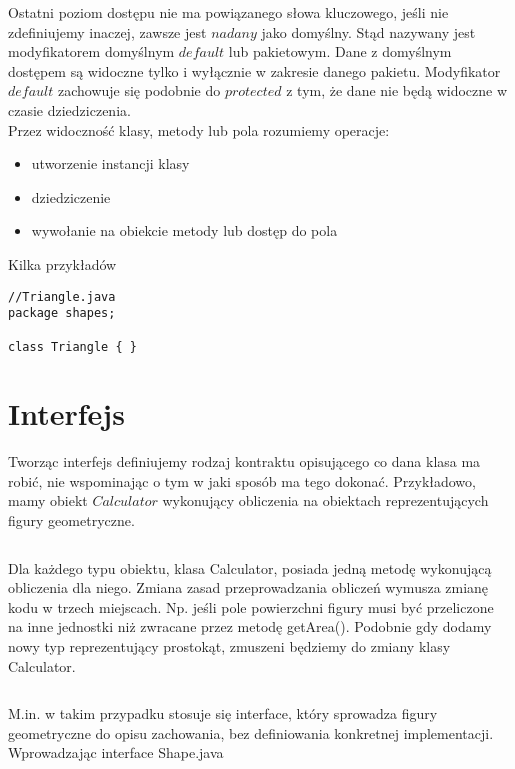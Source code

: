 \documentclass[11pt]{article}
\begin{document}
Ostatni poziom dostępu nie ma powiązanego słowa kluczowego, jeśli nie zdefiniujemy inaczej, zawsze jest $\textit{nadany}$ jako domyślny. Stąd nazywany jest modyfikatorem domyślnym $\textit{default}$ lub pakietowym.
Dane z domyślnym dostępem są widoczne tylko i wyłącznie w zakresie danego pakietu. Modyfikator $\textit{default}$ zachowuje się podobnie do $\textit{protected}$ z tym, że dane nie będą widoczne w czasie dziedziczenia.\\
Przez widoczność klasy, metody lub pola rozumiemy operacje:
\begin{itemize}
\item utworzenie instancji klasy
\item dziedziczenie
\item wywołanie na obiekcie metody lub dostęp do pola
\end{itemize}  
Kilka przykładów
\begin{lstlisting}
//Triangle.java
package shapes;

class Triangle { }

\end{lstlisting}


\section{Interfejs}

Tworząc interfejs definiujemy rodzaj kontraktu opisującego co dana klasa ma robić, nie wspominając o tym w jaki sposób ma tego dokonać.
Przykładowo, mamy obiekt $\textit{Calculator}$ wykonujący obliczenia na obiektach reprezentujących figury geometryczne.

\inputminted[bgcolor=bg,linenos=true]{java}{src/w05/Calculator.java}
 
 
Dla każdego typu obiektu, klasa Calculator, posiada jedną metodę wykonującą obliczenia dla niego.  Zmiana zasad przeprowadzania obliczeń wymusza zmianę kodu w trzech miejscach. Np. jeśli pole powierzchni figury musi być przeliczone na inne jednostki niż zwracane przez metodę getArea(). Podobnie gdy dodamy nowy typ reprezentujący prostokąt, zmuszeni będziemy do zmiany klasy Calculator. 

\inputminted[bgcolor=bg,linenos=true]{java}{src/w05/Calculatornewshape.java}

M.in. w takim przypadku stosuje się interface, który sprowadza figury geometryczne do opisu zachowania, bez definiowania konkretnej implementacji. Wprowadzając interface Shape.java

\inputminted[bgcolor=bg,linenos=true]{java}{src/w05/Shape.java}
\end{document}
